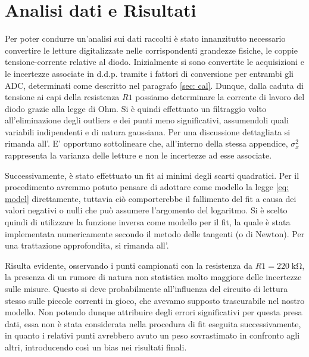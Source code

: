 \documentclass{article}[a4paper, oneside, 11pt]
\begin{document}
\section{Analisi dati e Risultati}
Per poter condurre un'analisi sui dati raccolti \`e stato innanzitutto
necessario convertire le letture digitalizzate nelle corrispondenti
grandezze fisiche, le coppie tensione-corrente relative al diodo.
Inizialmente si sono convertite le acquisizioni e le incertezze associate in
d.d.p. tramite i fattori di conversione per entrambi gli ADC,
determinati come descritto nel paragrafo \ref{sec: cal}.
Dunque, dalla caduta di tensione ai capi della resistenza $R1$ possiamo
determinare la corrente di lavoro del diodo grazie alla legge di Ohm. 
Si \`e quindi effettuato un filtraggio volto all'eliminazione degli outliers e 
dei punti meno significativi, assumendoli quali variabili indipendenti e di 
natura gaussiana. Per una discussione dettagliata si rimanda all'. E’ opportuno sottolineare che, all’interno della stessa appendice, 
$\sigma_x^2$ rappresenta la varianza delle letture e non le incertezze ad esse
associate.

Successivamente, \`e stato effettuato un fit ai minimi degli scarti quadratici.
Per il procedimento avremmo potuto pensare di adottare come modello la legge
\eqref{eq: model} direttamente, tuttavia ci\`o comporterebbe il fallimento del
fit a causa dei valori negativi o nulli che pu\`o assumere l'argomento del
logaritmo. Si \`e scelto quindi di utilizzare la funzione inversa come modello
per il fit, la quale \`e stata implementata numericamente secondo il metodo
delle tangenti (o di Newton).
Per una trattazione approfondita, si rimanda all'.

Risulta evidente, osservando i punti campionati con la resistenza da
$R1 = 220 \; \si{\kohm}$, la presenza di un rumore di natura non statistica
molto maggiore delle incertezze sulle misure. 
Questo si deve probabilmente all'influenza del circuito di lettura
stesso sulle piccole correnti in gioco, che avevamo supposto trascurabile
nel nostro modello. Non potendo dunque attribuire degli errori significativi
per questa presa dati, essa non \`e stata considerata nella procedura di
fit eseguita successivamente, in quanto i relativi punti avrebbero avuto un
peso sovrastimato in confronto agli altri, introducendo cos\`i un bias
nei risultati finali.
 
\end{document}
